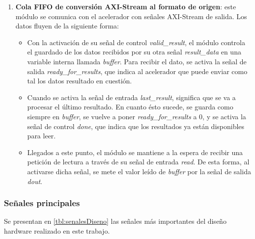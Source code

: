 \begin{enumerate}
    \item \textbf{Cola FIFO de conversión AXI-Stream al formato de origen}: este módulo se comunica con el acelerador con señales AXI-Stream de salida. Los datos fluyen de la siguiente forma:
    
    \begin{itemize}
        \item Con la activación de su señal de control \emph{valid\_result}, el módulo controla el guardado de los datos recibidos por su otra señal \emph{result\_data} en una variable interna llamada \textit{buffer}. Para recibir el dato, se activa la señal de salida \emph{ready\_for\_results}, que indica al acelerador que puede enviar como tal los datos resultado en cuestión.
        
        \item Cuando se activa la señal de entrada \emph{last\_result}, significa que se va a procesar el último resultado. En cuanto ésto sucede, se guarda como siempre en \emph{buffer}, se vuelve a poner \emph{ready\_for\_results} a 0, y se activa la señal de control \emph{done}, que indica que los resultados ya están disponibles para leer.
        
        \item Llegados a este punto, el módulo se mantiene a la espera de recibir una petición de lectura a través de su señal de entrada \emph{read}. De esta forma, al activarse dicha señal, se mete el valor leído de \emph{buffer} por la señal de salida \emph{dout}.

    \end{itemize}
\end{enumerate}

\subsubsection{Señales principales}
Se presentan en \ref{tbl:senalesDiseno} las señales más importantes del diseño hardware realizado en este trabajo. 

